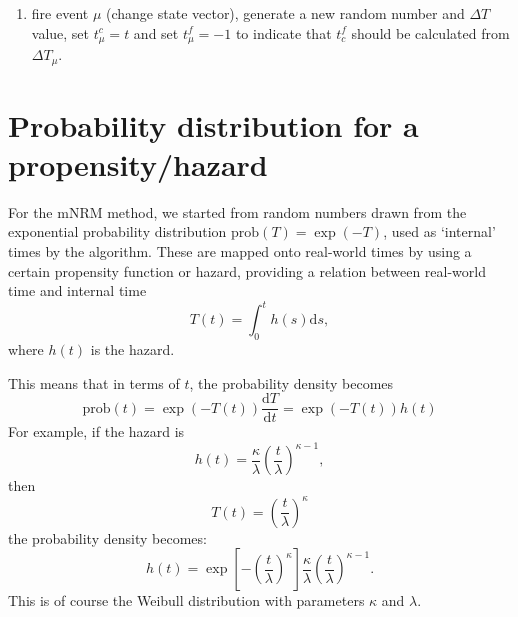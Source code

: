 \documentclass[a4paper,11pt]{article}
\newcommand{\ud}{\mathrm{d}}
\newcommand{\mpt}{\mathrm{.}}
\newcommand{\mcm}{\mathrm{,}}
\newcommand{\prob}{\mathrm{prob}}
\begin{document}
\begin{itemize}
\begin{enumerate}
					\item fire event $\mu$ (change state vector), generate a new random number and $\Delta T$ value, set
						$t^c_\mu = t$ and set $t^f_\mu = -1$ to indicate that $t^f_c$ should be calculated from
						$\Delta T_\mu$.
	
				\end{enumerate}
			\end{itemize}

	\section{Probability distribution for a propensity/hazard}	

		For the mNRM method, we started from random numbers drawn from the exponential
		probability distribution $\prob(T) = \exp(-T)$, used as `internal' times by
		the algorithm. These are mapped onto real-world times by using a certain propensity
		function or hazard, providing a relation between real-world time and internal
		time
		\[ T(t) = \int_0^t h(s) \ud s \mcm \]
		where $h(t)$ is the hazard.

		This means that in terms of $t$, the probability density becomes
		\[ \prob(t) = \exp(-T(t)) \frac{\ud T}{\ud t} = \exp(-T(t)) h(t) \]
		For example, if the hazard is
		\[ h(t) = \frac{\kappa}{\lambda}\left(\frac{t}{\lambda}\right)^{\kappa-1} \mcm \]
		then
		\[ T(t) = \left(\frac{t}{\lambda}\right)^\kappa \]
		the probability density becomes:
		\[ h(t) = \exp\left[-\left(\frac{t}{\lambda}\right)^\kappa\right] \frac{\kappa}{\lambda}\left(\frac{t}{\lambda}\right)^{\kappa-1} \mpt \]
		This is of course the Weibull distribution with parameters $\kappa$ and $\lambda$.
	
\end{document}
